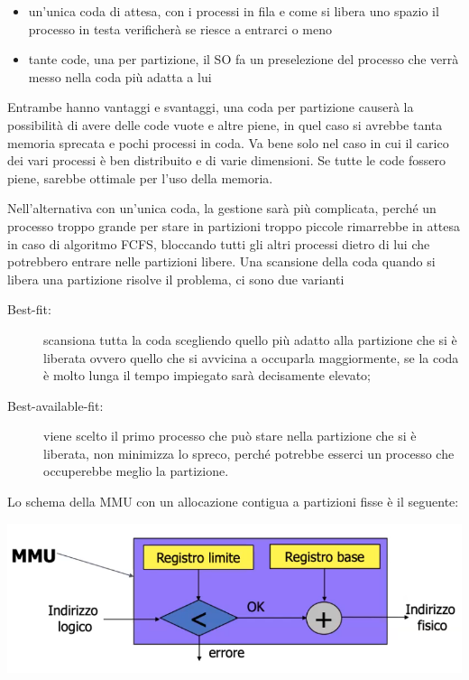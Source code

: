 \documentclass[a4paper, 12pt]{book}
\begin{document}
    \begin{itemize}
        \item un'unica coda di attesa, con i processi in fila e come si libera uno spazio il processo in testa verificherà
        se riesce a entrarci o meno
        \item tante code, una per partizione, il SO fa un preselezione del processo che verrà messo nella coda più adatta a lui
    \end{itemize}

    Entrambe hanno vantaggi e svantaggi, una coda per partizione causerà la possibilità di avere delle code vuote e altre piene, 
    in quel caso si avrebbe tanta memoria sprecata e pochi processi in coda. Va bene solo nel caso in cui il carico dei vari processi
    è ben distribuito e di varie dimensioni. Se tutte le code fossero piene, sarebbe ottimale per l'uso della memoria.

    Nell'alternativa con un'unica coda, la gestione sarà più complicata, perché un processo troppo grande per stare in partizioni
    troppo piccole rimarrebbe in attesa in caso di algoritmo FCFS, bloccando tutti gli altri processi dietro di lui che 
    potrebbero entrare nelle partizioni libere. Una scansione della coda quando si libera una partizione risolve il problema, ci 
    sono due varianti
    
    \begin{description}
        \item[Best-fit:] scansiona tutta la coda scegliendo quello più adatto alla partizione che si è liberata
        ovvero quello che si avvicina a occuparla maggiormente, se la coda è molto lunga il tempo impiegato sarà decisamente
        elevato;
        \item[Best-available-fit:] viene scelto il primo processo che può stare nella partizione che si è liberata, non minimizza
        lo spreco, perché potrebbe esserci un processo che occuperebbe meglio la partizione.
    \end{description}

Lo schema della MMU con un allocazione contigua a partizioni fisse è il seguente:

\begin{center}
    \includegraphics[width=1\textwidth]{mmu_partizioni_fisse.png}
\end{center}
\end{document}
